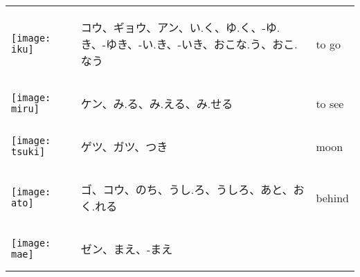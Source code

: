 \documentclass[a4paper,12pt]{extarticle}
\begin{document}
\begin{longtable}{|lp{6cm}p{4cm}|}
\\ 
\begin{minipage}{0.3\textwidth}
\centerline{
	\texttt{[image: iku]}
}
\end{minipage}
&
\begin{CJK}{UTF8}{min}コウ、ギョウ、アン、い.く、ゆ.く、-ゆ.き、-ゆき、-い.き、-いき、おこな.う、おこ.なう\end{CJK}
&
to go
\\ 
\begin{minipage}{0.3\textwidth}
\centerline{
	\texttt{[image: miru]}
}
\end{minipage}
&
\begin{CJK}{UTF8}{min}ケン、み.る、み.える、み.せる\end{CJK}
&
to see
\\ 
\begin{minipage}{0.3\textwidth}
\centerline{
	\texttt{[image: tsuki]}
}
\end{minipage}
&
\begin{CJK}{UTF8}{min}ゲツ、ガツ、つき\end{CJK}
&
moon
\\ 
\begin{minipage}{0.3\textwidth}
\centerline{
	\texttt{[image: ato]}
}
\end{minipage}
&
\begin{CJK}{UTF8}{min}ゴ、コウ、のち、うし.ろ、うしろ、あと、おく.れる\end{CJK}
&
behind
\\ 
\begin{minipage}{0.3\textwidth}
\centerline{
	\texttt{[image: mae]}
}
\end{minipage}
&
\begin{CJK}{UTF8}{min}ゼン、まえ、-まえ\end{CJK}

\end{longtable}
\end{document}
